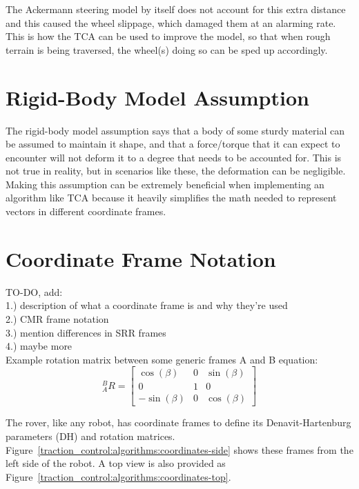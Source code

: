 The Ackermann steering model by itself does not account for this extra distance and this caused the wheel slippage, which damaged them at an alarming rate. This is how the \ac{TCA} can be used to improve the model, so that when rough terrain is being traversed, the wheel(s) doing so can be sped up accordingly.

\section{Rigid-Body Model Assumption}
The rigid-body model assumption says that a body of some sturdy material can be assumed to maintain it shape, and that a force/torque that it can expect to encounter will not deform it to a degree that needs to be accounted for. This is not true in reality, but in scenarios like these, the deformation can be negligible. \\

Making this assumption can be extremely beneficial when implementing an algorithm like \ac{TCA} because it heavily simplifies the math needed to represent vectors in different coordinate frames.

\section{Coordinate Frame Notation}

TO-DO, add: \\
 1.) description of what a coordinate frame is and why they're used \\
 2.) \ac{CMR} frame notation \\
 3.) mention differences in \ac{SRR} frames \\
 4.) maybe more \\

Example rotation matrix between some generic frames A and B equation:
\begin{equation}
	{}^{B}_{A}R = \left[\begin{array}{ccc}
		 \cos(\beta) & 0 & \sin(\beta) \\
		 0           & 1 & 0           \\
		-\sin(\beta) & 0 & \cos(\beta)
	\end{array}\right]
\end{equation}

The rover, like any robot, has coordinate frames to define its Denavit-Hartenburg parameters (DH) and rotation matrices. Figure~\ref{traction_control:algorithms:coordinates-side} shows these frames from the left side of the robot. A top view is also provided as Figure~\ref{traction_control:algorithms:coordinates-top}.

